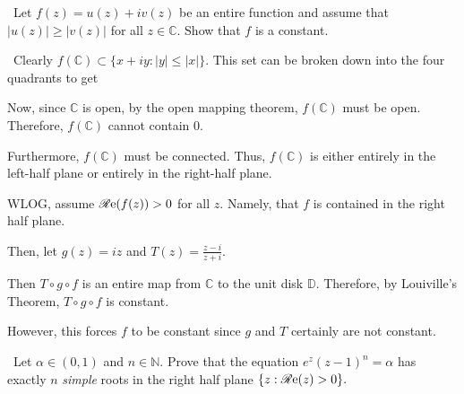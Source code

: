 \documentclass[12pt]{Qual}
\begin{document}
\begin{problem} $\,$
Let $f(z)=u(z)+iv(z)$ be an entire function and assume that $|u(z)|\ge|v(z)|$ for all $z\in\mathbb{C}.$ Show that $f$ is a constant.
\end{problem}


\begin{solution}$\,$
Clearly $f(\mathbb{C})\subset\{x+iy:|y|\le|x|\}.$ This set can be broken down into the four quadrants to get

\begin{center}
\end{center}

Now, since $\mathbb{C}$ is open, by the open mapping theorem, $f(\mathbb{C})$ must be open. Therefore, $f(\mathbb{C})$ cannot contain $0$.

Furthermore, $f(\mathbb{C})$ must be connected. Thus, $f(\mathbb{C})$ is either entirely in the left-half plane or entirely in the right-half plane.

WLOG, assume $\mathscr{R}\text{e}(f(z))>0$ for all $z.$ Namely, that $f$ is contained in the right half plane.

Then, let $g(z)=iz$ and $T(z)=\frac{z-i}{z+i}$.

Then $T\circ g\circ f$ is an entire map from $\mathbb{C}$ to the unit disk $\mathbb{D}$. Therefore, by Louiville's Theorem, $T\circ g\circ f$ is constant.

However, this forces $f$ to be constant since $g$ and $T$ certainly are not constant.
\end{solution}
\newpage



\begin{problem} $\,$
Let $\alpha\in(0,1)$ and $n\in\mathbb{N}$. Prove that the equation $e^z(z-1)^n=\alpha$ has exactly $n$ \textit{simple} roots in the right half plane $\{z:\mathscr{R}\text{e}(z)>0\}.$
\end{problem}
\end{document}
